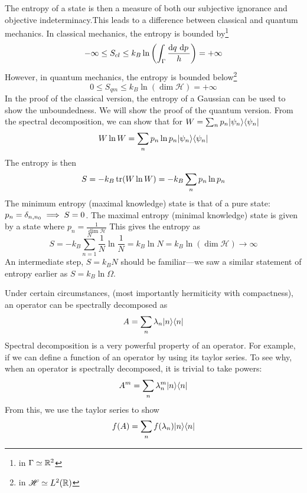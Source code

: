 The entropy of a state is then a measure of both our subjective ignorance and objective indeterminacy.This leads to a difference between classical and quantum mechanics. In classical mechanics, the entropy is bounded by\footnote{in \(\Gamma \simeq \mathbb{R}^2\)}
\[-\infty \leq S_{cl} \leq k_B \ln\left(\int_\Gamma \frac{\d{q}\d{p}}{h}\right) = +\infty\]
However, in quantum mechanics, the entropy is bounded below\footnote{in \(\mathscr H \simeq L^2(\mathbb{R})\)}
\[0\leq S_{qm} \leq k_B \ln \left(\dim\mathscr H\right) = +\infty\]
In the proof of the classical version, the entropy of a Gaussian can be used to show the unboundedness. We will show the proof of the quantum version. From the spectral decomposition, we can show that for \(W = \sum_n p_n \lvert\psi_n\rangle\langle\psi_n\rvert\)
\[W\ln W = \sum_n p_n \ln p_n \lvert\psi_n\rangle\langle\psi_n\rvert\]
The entropy is then 
\[S = -k_B\operatorname{tr}(W\ln W) = -k_B\sum_n p_n \ln p_n\]
The minimum entropy (maximal knowledge) state is that of a pure state: \(p_n = \delta_{n,n_0} \implies S = 0\).
The maximal entropy (minimal knowledge) state is given by a state where \(p_n = \frac{1}{\dim\mathscr H}\) This gives the entropy as
\[S = -k_B\sum_{n=1}^N \frac{1}{N}\ln \frac{1}{N} = k_B\ln N = k_B\ln (\dim \mathscr H)\to\infty\]
An intermediate step, \(S = k_B N\) should be familiar---we saw a similar statement of entropy earlier as \(S = k_B\ln \Omega\).


\begin{aside}
	Under certain circumstances, (most importantly hermiticity with compactness\footnotemark), an operator can be spectrally decomposed as
	\[A = \sum_n \lambda_n\lvert n\rangle\langle n\rvert\]
	Spectral decomposition is a very powerful property of an operator. For example, if we can define a function of an operator by using its taylor series. To see why, when an operator is spectrally decomposed, it is trivial to take powers:
	\[A^m = \sum_n \lambda_n^m\lvert n\rangle\langle n\rvert\]
	From this, we use the taylor series to show
	\[f(A) = \sum_n f(\lambda_n)\lvert n\rangle\langle n\rvert\]
\end{aside}


